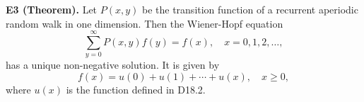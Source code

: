 \textbf{E3 (Theorem).} Let $P(x,y)$ be the transition function of a recurrent aperiodic random walk in one dimension. Then the Wiener-Hopf equation
$$\sum_{y=0}^{\infty} P(x,y)f(y) = f(x), \quad x = 0, 1, 2, \dots,$$
has a unique non-negative solution. It is given by
$$f(x) = u(0) + u(1) + \cdots + u(x), \quad x \geq 0,$$
where $u(x)$ is the function defined in D18.2.
